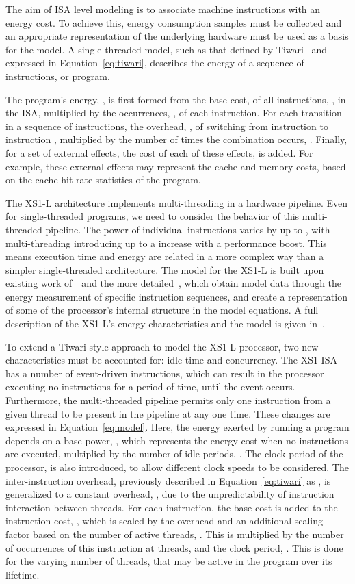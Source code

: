 \documentclass[9pt,preprint]{sigplanconf}
\begin{document}
The aim of ISA level modeling is to associate machine instructions with an
energy cost. To achieve this, energy consumption samples must be collected and
an appropriate representation of the underlying hardware must be used as a basis
for the model. A single-threaded model, such as that defined by
Tiwari~\cite{Tiwari-embedded-1994} and expressed in Equation~\ref{eq:tiwari},
describes the energy of a sequence of instructions, or program.

The program's energy, , is first formed from the base cost,
 of all instructions, , in the ISA, multiplied by the occurrences,
, of each instruction. For each transition in a sequence of instructions,
the overhead, , of switching from instruction  to instruction ,
multiplied by the number of times the combination  occurs, .
Finally, for a set of  external effects, the cost of each of these effects,
 is added. For example, these external effects may represent the cache and
memory costs, based on the cache hit rate statistics of the program.

The XS1-L architecture implements multi-threading in a hardware pipeline. Even
for single-threaded programs, we need to consider the behavior of this
multi-threaded pipeline. The power of individual instructions varies by up to
, with multi-threading introducing up to a  increase with a  performance
boost.  This means execution time and energy are related in a more complex way
than a simpler single-threaded architecture. The model for the XS1-L is built
upon existing work of~\cite{Tiwari-Instruction-level-1996}~and the more
detailed~\cite{Steinke2001}, which obtain model data through the energy
measurement of specific instruction sequences, and create a representation of
some of the processor's internal structure in the model equations. A full
description of the XS1-L's energy characteristics and the model is given
in~\cite{Kerrison13}.

To extend a Tiwari style approach to model the XS1-L processor, two new
characteristics must be accounted for: idle time and concurrency. The XS1
ISA has a number of event-driven instructions, which can result in the processor
executing no instructions for a period of time, until the event occurs.
Furthermore, the multi-threaded pipeline permits only one instruction from a
given thread to be present in the pipeline at any one time. These changes are
expressed in Equation~\ref{eq:model}. Here, the energy exerted
by running a program depends on a base power, , which represents
the energy cost when no instructions are executed, multiplied by the number of idle periods,
. The clock period of the processor,  is also
introduced, to allow different clock speeds to be considered. The
inter-instruction overhead, previously described in Equation~\ref{eq:tiwari} as
, is generalized to a constant overhead, , due to the
unpredictability of instruction interaction between threads. For each
instruction, the base cost is added to the instruction cost, , which is
scaled by the overhead and an additional scaling factor based on the number of
active threads, . This is multiplied by the number of occurrences of this
instruction at  threads,  and the clock period, . This
is done for the varying number of threads,  that may be active in the program
over its lifetime.
\end{document}
